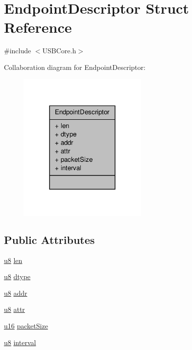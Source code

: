 \hypertarget{struct_endpoint_descriptor}{\section{Endpoint\-Descriptor Struct Reference}
\label{struct_endpoint_descriptor}
}


{\ttfamily \#include $<$U\-S\-B\-Core.\-h$>$}



Collaboration diagram for Endpoint\-Descriptor\-:
\nopagebreak
\begin{figure}[H]
\begin{center}
\leavevmode
\includegraphics[width=180pt]{struct_endpoint_descriptor__coll__graph}
\end{center}
\end{figure}
\subsection*{Public Attributes}
\begin{DoxyCompactItemize}
\item 
\hyperlink{_platform_8h_aed742c436da53c1080638ce6ef7d13de}{u8} \hyperlink{struct_endpoint_descriptor_ac4c8c282264bb159bc4f789555cf8023}{len}
\item 
\hyperlink{_platform_8h_aed742c436da53c1080638ce6ef7d13de}{u8} \hyperlink{struct_endpoint_descriptor_a858d2fed4b36c0b974ee0827fedec23a}{dtype}
\item 
\hyperlink{_platform_8h_aed742c436da53c1080638ce6ef7d13de}{u8} \hyperlink{struct_endpoint_descriptor_a889ee6bef249cfc21fb0ea12cb6d43f6}{addr}
\item 
\hyperlink{_platform_8h_aed742c436da53c1080638ce6ef7d13de}{u8} \hyperlink{struct_endpoint_descriptor_a4ef2e3e8ce76f15b3d9a6685e6815681}{attr}
\item 
\hyperlink{_platform_8h_a9e6c91d77e24643b888dbd1a1a590054}{u16} \hyperlink{struct_endpoint_descriptor_a2e22c1c94c5f4637abae1184b35cab9c}{packet\-Size}
\item 
\hyperlink{_platform_8h_aed742c436da53c1080638ce6ef7d13de}{u8} \hyperlink{struct_endpoint_descriptor_a554a59624f5e7b888fd457000cdcec2e}{interval}
\end{DoxyCompactItemize}


